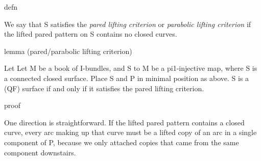 defn

We say that S satisfies the \emph{pared lifting criterion} or \emph{parabolic
lifting criterion} if the lifted pared pattern on S contains no closed curves.

lemma (pared/parabolic lifting criterion)

Let Let M be a book of I-bundles, and S to M be a pi1-injective map, where S is
a connected closed surface.  Place S and P in minimal position as above. S is
a (QF) surface if and only if it satisfies the pared lifting criterion.

proof

One direction is straightforward. If the lifted pared pattern contains a closed
curve, every arc making up that curve must be a lifted copy of an arc in
a single component of P, because we only attached copies that came from the
same component downstairs. %

